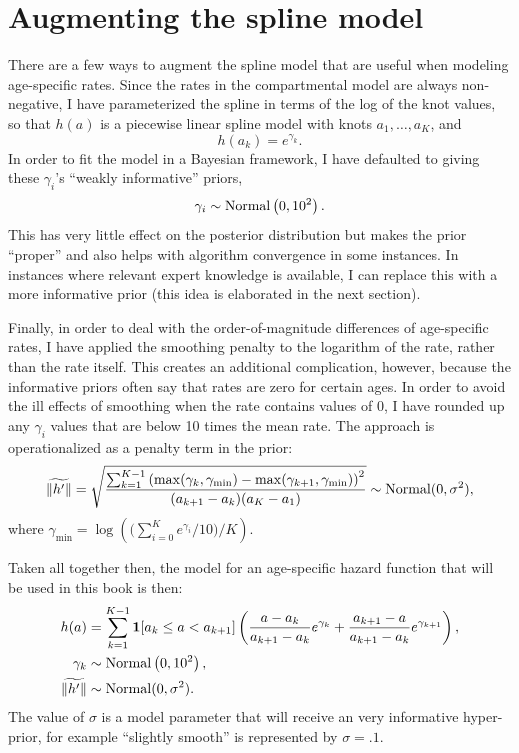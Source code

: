 \section{Augmenting the spline model}
There are a few ways to augment the spline model that are useful when
modeling age-specific rates. Since the rates in the compartmental
model are always non-negative, I have parameterized the spline in
terms of the log of the knot values, so that $h(a)$ is a piecewise
linear spline model with knots $a_1,\ldots,a_K$, and
\[
h(a_k) = e^{\gamma_k}.
\]
In order to fit the model in a Bayesian framework, I have defaulted to
giving these $\gamma_i$'s ``weakly informative'' priors,
\[
\gamma_i \sim \operatorname{Normal}\left(0, 10^2\right).
\]
This has very little effect on the posterior distribution but makes
the prior ``proper'' and also helps with algorithm convergence in
some instances. In instances where relevant expert knowledge is
available, I can replace this with a more informative prior (this idea
is elaborated in the next section).

Finally, in order to deal with the order-of-magnitude differences of
age-specific rates, I have applied the smoothing penalty to the
logarithm of the rate, rather than the rate itself.  This creates an additional
complication, however, because the informative priors often say that
rates are zero for certain ages.  In order to avoid the ill effects of
smoothing when the rate contains values of $0$, I have
rounded up any $\gamma_i$ values that are below 10 times the mean
rate.  The approach is operationalized as a penalty term in the prior:
\[
\widetilde{\|h'\|} = \sqrt{\frac{\sum_{k=1}^{K-1}
\left(\max(\gamma_k, \gamma_{\min})
-
\max(\gamma_{k+1}, \gamma_{\min})\right)^2
}{(a_{k+1}-a_k)(a_K-a_1)}} \sim \operatorname{Normal}(0, \sigma^2),
\]
where $\gamma_{\min} = \log\left(\bigg(\sum_{i=0}^K e^{\gamma_i}/10\bigg)
/ K\right)$.


Taken all together then, the model for an age-specific hazard function
that will be used in this book is then:
\begin{align*}
h(a) &= \sum_{k=1}^{K-1} \mathbf{1}[a_k \leq a < a_{k+1}]
\left( \frac{a-a_k}    {a_{k+1}-a_k} e^{\gamma_k}
     + \frac{a_{k+1}-a}{a_{k+1}-a_k} e^{\gamma_{k+1}}\right),\\
\gamma_k &\sim \operatorname{Normal}\left(0, 10^2\right),\\
\widetilde{\|h'\|} &\sim \operatorname{Normal}(0, \sigma^2).\\
\end{align*}
The value of $\sigma$ is a model parameter that will receive an very
informative hyper-prior, for example ``slightly smooth'' is
represented by $\sigma=.1$.




